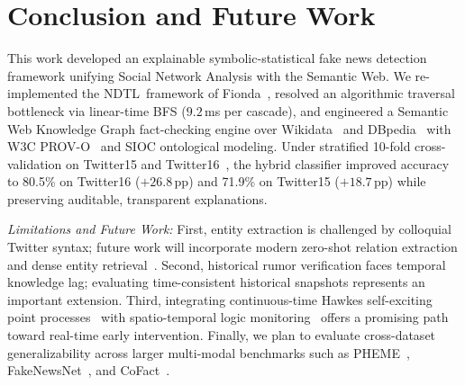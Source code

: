 \documentclass[10pt,twocolumn,a4paper]{article}
\newcommand{\NDTL}{\textsc{NDTL}}
\begin{document}
\section{Conclusion and Future Work}
This work developed an explainable symbolic-statistical fake news detection framework unifying Social Network Analysis with the Semantic Web. We re-implemented the \NDTL\ framework of Fionda~\cite{fionda2025}, resolved an algorithmic traversal bottleneck via linear-time BFS ($9.2$\,ms per cascade), and engineered a Semantic Web Knowledge Graph fact-checking engine over Wikidata~\cite{vrandecic2014} and DBpedia~\cite{lehmann2015} with W3C PROV-O~\cite{lebo2013} and SIOC ontological modeling. Under stratified 10-fold cross-validation on Twitter15 and Twitter16~\cite{ma2016, ma2017}, the hybrid classifier improved accuracy to 80.5\% on Twitter16 ($+26.8\,\mathrm{pp}$) and 71.9\% on Twitter15 ($+18.7\,\mathrm{pp}$) while preserving auditable, transparent explanations.

\emph{Limitations and Future Work:} First, entity extraction is challenged by colloquial Twitter syntax; future work will incorporate modern zero-shot relation extraction and dense entity retrieval~\cite{pan2024unifying}. Second, historical rumor verification faces temporal knowledge lag; evaluating time-consistent historical snapshots represents an important extension. Third, integrating continuous-time Hawkes self-exciting point processes~\cite{zhao2015seismic, farajtabar2017fake} with spatio-temporal logic monitoring~\cite{nenzi2015sstl} offers a promising path toward real-time early intervention. Finally, we plan to evaluate cross-dataset generalizability across larger multi-modal benchmarks such as PHEME~\cite{zubiaga2016pheme}, FakeNewsNet~\cite{shufakenewsnet2020}, and CoFact~\cite{choi2021cofact}.
\end{document}
